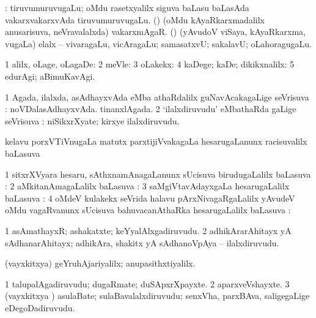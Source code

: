 \noindent
\gl{\pagu}
\bmng
{}: 
\banum
{} tiruvumuruvugaLu; oMdu rasetxyalilx siguva baLasu baLasAda vakarxvakarxvAda tiruvumuruvugaLu. 
 (\rUpa) (oMdu kAyaRkarxmadalilx anusarisuva, neVravalalxda) vakarxmAgaR. 
 (\rUpa) (yAvudoV viSaya, kAyaRkarxma, \mo vugaLa) elalx -- vivaragaLu, vicAragaLu; samasatxvU; sakalavU; oLahoragugaLu. 
\eanum
\emng
\eentry

\bentry
{}
\gl{\pUparx}
\bmng
\bnum
\num{1} alilx, oLage, oLagaDe:  
\num{2} meVle:  
\num{3} oLakekx:  
\num{4} kaDege; kaDe; dikikxnalilx:  
\num{5} edurAgi; aBimuKavAgi. 
\enum
\emng
\eentry

\bentry
{}
\gl{\pUparx}
\bmng
\bnum
\num{1} Agada, ilalxda, asAdhayxvAda eMba athaRdalilx guNavAcakagaLige seVrisuva \pUparx:  noVDalasAdhayxvAda.  tinanxlAgada. 
\num{2} `ilalxdiruvudu' eMbathaRda \nA gaLige seVrisuva \pUparx:  niSikxrXyate; kirxye ilalxdiruvudu. 
\enum
\emng
\eentry

\bentry
{}
\gl{\uparx}
\bmng
kelavu porxVTiVnugaLa matutx parxtijiVvakagaLa hesarugaLanunx racisuvalilx baLasuva \uparx\  
\emng
\eentry

\bentry
{}
\gl{\uparx}
\bmng
\bnum
\num{1} sitxrXVyara hesaru, sAthxnamAnagaLanunx sUcisuva birudugaLalilx baLasuva \uparx:  
\num{2} aMkitanAmagaLalilx baLasuva \uparx:  
\num{3} saMgiVtavAdayxgaLa hesarugaLalilx baLasuva \uparx:  
\num{4} oMdeV kulakekx seVrida halavu pArxNivagaRgaLalilx yAvudeV oMdu vagaRvanunx sUcisuva bahuvacanAthaRka hesarugaLalilx baLasuva \uparx:  
\enum
\emng
\eentry

\bentry
{}
\gl{\nA}
\bmng
\bnum
\num{1} asAmathayxR; ashakatxte; keYyalAlxgadiruvudu. 
\num{2} adhikArarAhitayx yA sAdhanarAhitayx; adhikAra, shakitx yA sAdhanoVpAya -- ilalxdiruvudu. 
\enum
\emng
\eentry

\bentry
{}
\gl{\kirxvi}
\expl{\Latin}
\bmng
 (vayxkitxya) geYruhAjariyalilx; anupasithxtiyalilx. 
\emng
\eentry

 \bentry
{}
\gl{\nA}
\bmng
\bnum
\num{1} talupalAgadiruvudu; dugaRmate; duSApxrXpayxte. 
\num{2} aparxveVshayxte. 
\num{3} (vayxkitxya \vi) asulaBate; sulaBavalalxdiruvudu; senxVha, parxBAva, saligegaLige eDegoDadiruvudu. 
\enum
\emng
\eentry

